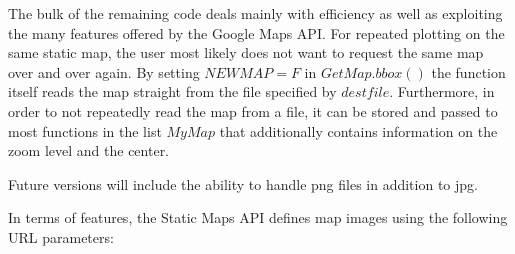 \documentclass{article}
\begin{document}
\noindent The bulk of the remaining code deals mainly with efficiency as well as exploiting the many features offered by the Google Maps API.
For repeated plotting on the same static map, the user most likely does not want to request the same map over and over again. 
By setting $NEWMAP = F$ in $GetMap.bbox()$ the function itself reads the map straight from the file specified by $destfile$.
Furthermore, in order to not repeatedly read the map from a file, it can be stored and passed to most functions in the list $MyMap$ that additionally contains information on the zoom level and the center.

Future versions will include the ability to handle png files in addition to jpg.

\noindent In terms of features, the Static Maps API defines map images using the following URL parameters:
\end{document}
